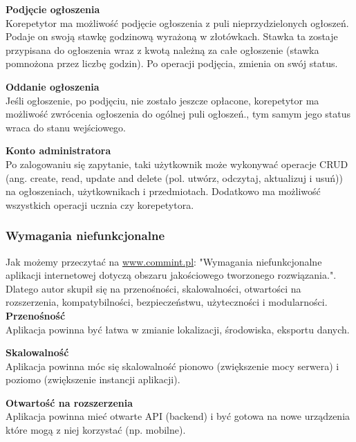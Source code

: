 \documentclass[12pt]{article}
\numberwithin{figure}{section}
\begin{document}
    \noindent
    \textbf{Podjęcie ogłoszenia}\\
    \indent
    Korepetytor ma możliwość podjęcie ogłoszenia z puli nieprzydzielonych ogłoszeń. Podaje on swoją stawkę godzinową wyrażoną w złotówkach. Stawka ta zostaje przypisana do ogłoszenia wraz z kwotą należną za całe ogłoszenie (stawka pomnożona przez liczbę godzin). Po operacji podjęcia, zmienia on swój status.
        
    \noindent
    \textbf{Oddanie ogłoszenia}\\
    \indent
    Jeśli ogłoszenie, po podjęciu, nie zostało jeszcze opłacone, korepetytor ma możliwość zwrócenia ogłoszenia do ogólnej puli ogłoszeń., tym samym jego status wraca do stanu wejściowego. 
        
    \noindent
    \textbf{Konto administratora}\\
    \indent
    Po zalogowaniu się zapytanie, taki użytkownik może wykonywać operacje CRUD (ang. create, read, update and delete (pol. utwórz, odczytaj, aktualizuj i usuń)) na ogłoszeniach, użytkownikach i przedmiotach. Dodatkowo ma możliwość wszystkich operacji ucznia czy korepetytora.

\subsubsection{Wymagania niefunkcjonalne}
        
        Jak możemy przeczytać na \url{www.commint.pl}: "Wymagania niefunkcjonalne aplikacji internetowej dotyczą obszaru jakościowego tworzonego rozwiązania."\cite{niefunkcjonalne}. Dlatego autor skupił się na przenośności, skalowalności, otwartości na rozszerzenia, kompatybilności, bezpieczeństwu, użyteczności i modularności.\\
        \noindent
        \textbf{Przenośność}\\
        \indent
        Aplikacja powinna być łatwa w zmianie lokalizacji, środowiska, eksportu danych.
        
        \noindent
        \textbf{Skalowalność}\\
        \indent
        Aplikacja powinna móc się skalowalność pionowo (zwiększenie mocy serwera) i poziomo (zwiększenie instancji aplikacji).
        
        \noindent
        \textbf{Otwartość na rozszerzenia}\\
        \indent
        Aplikacja powinna mieć otwarte API (backend) i być gotowa na nowe urządzenia które mogą z niej korzystać (np. mobilne).
        
\end{document}
